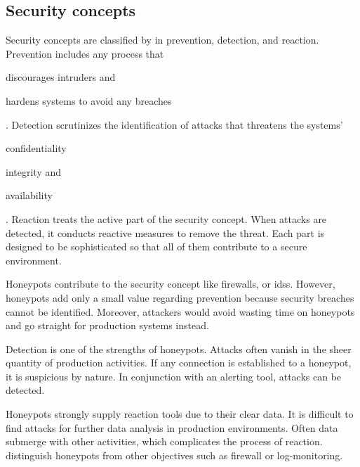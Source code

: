 \subsection{Security concepts}
\label{subsec:honeypot-security-concept}

Security concepts are classified by \citet{Schneier2004} in prevention, detection, and reaction.
Prevention includes any process that
\begin{enumerate*}[label=(\roman*)]
    \item discourages intruders and
    \item hardens systems to avoid any breaches
\end{enumerate*}.
Detection scrutinizes the identification of attacks that threatens the systems'
\begin{enumerate*}[label=(\roman*)]
    \item confidentiality
    \item integrity and
    \item availability
\end{enumerate*}.
Reaction treats the active part of the security concept.
When attacks are detected, it conducts reactive measures to remove the threat.
Each part is designed to be sophisticated so that all of them contribute to a secure environment. \cite{NawrockiWSKS2016}

Honeypots contribute to the security concept like firewalls, or \acp{ids}.
However, honeypots add only a small value regarding prevention because security breaches cannot be identified.
Moreover, attackers would avoid wasting time on honeypots and go straight for production systems instead.

Detection is one of the strengths of honeypots.
Attacks often vanish in the sheer quantity of production activities.
If any connection is established to a honeypot, it is suspicious by nature.
In conjunction with an alerting tool, attacks can be detected.

Honeypots strongly supply reaction tools due to their clear data.
It is difficult to find attacks for further data analysis in production environments.
Often data submerge with other activities, which complicates the process of reaction. \cite{NawrockiWSKS2016}
\citet{NawrockiWSKS2016} distinguish honeypots from other objectives such as firewall or log-monitoring.

